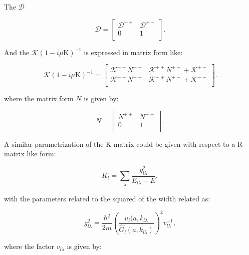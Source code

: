 \documentclass[openany]{book}
\begin{document}
The $\mathcal{D}$ 

\begin{equation}\label{eq:rmatrix_kmatrix_D_matrixElements}
	\mathcal{D} = \left[\begin{matrix}
		\mathcal{D}^{++} & \mathcal{D}^{+-} \\
		0	 &	1	 \\
	\end{matrix}\right].
\end{equation}

And the $\mathcal{K}(1 - i\mu \mathrm{K})^{-1}$ is expressed in matrix form like:

\begin{equation}\label{eq:rmatrix_kmatrix_KN_matrixElements}
	\mathcal{K}(1 - i\mu \mathrm{K})^{-1}= \left[\begin{matrix}
		\mathcal{K}^{++} {N}^{++} & \mathcal{K}^{++} {N}^{+-} + \mathcal{K}^{+-} \\
		\mathcal{K}^{-+} {N}^{++} & \mathcal{K}^{-+} {N}^{+-} + \mathcal{K}^{--} \\
	\end{matrix}\right].
\end{equation}

where the matrix form $N$ is given by:


\begin{equation}\label{eq:rmatrix_kmatrix_N_matrixElements}
	N = \left[\begin{matrix}
		N^{++} & N^{+-} \\
		0	 &	1	 \\
	\end{matrix}\right].
\end{equation}


A similar parametrization of the K-matrix could be given with respect to a R-matrix like form: 

\begin{equation}\label{eq:rmatrix_kmatrix_series}
	K_l =  \sum_\lambda { \frac{g^2_{l\lambda}}{E_{l\lambda} - E}},
\end{equation}

with the parameters related to the squared of the width related as: 

\begin{equation}\label{eq:rmatrix_kmatrix_g}
	g^2_{l\lambda} = \frac{\hbar^2}{2m} \left(\frac{u_l(a, k_{l\lambda}}{\hat G_l (a, k_{
			l\lambda})}  \right)^2 v^{-1}_{l\lambda},
\end{equation}

where the factor $v_{l\lambda}$ is given by:
\end{document}
